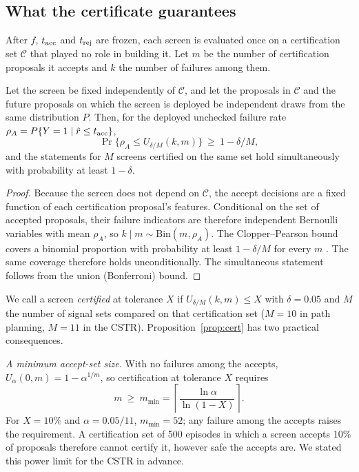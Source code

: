 \subsection{What the certificate guarantees}
After $f$, $t_{\mathrm{acc}}$ and $t_{\mathrm{rej}}$ are frozen, each screen is evaluated once on a certification set $\mathcal C$ that
played no role in building it. Let $m$ be the number of certification proposals it accepts and $k$ the number
of failures among them.

\begin{proposition}\label{prop:cert}
Let the screen be fixed independently of $\mathcal C$, and let the proposals in $\mathcal C$ and the future
proposals on which the screen is deployed be independent draws from the same distribution $P$. Then, for the
deployed unchecked failure rate $\rho_A=P\{Y=1\mid \hat r\le t_{\mathrm{acc}}\}$,
\[
\Pr\bigl\{\rho_A\le U_{\delta/M}(k,m)\bigr\}\ \ge\ 1-\delta/M,
\]
and the statements for $M$ screens certified on the same set hold simultaneously with probability at least
$1-\delta$.
\end{proposition}
\begin{proof}
Because the screen does not depend on $\mathcal C$, the accept decisions are a fixed function of each
certification proposal's features. Conditional on the set of accepted proposals, their failure indicators are
therefore independent Bernoulli variables with mean $\rho_A$, so $k\mid m\sim\mathrm{Bin}(m,\rho_A)$. The
Clopper--Pearson bound covers a binomial proportion with probability at least $1-\delta/M$ for every $m$
\citep{clopper1934}. The same coverage therefore holds unconditionally. The simultaneous statement follows from
the union (Bonferroni) bound.
\end{proof}

We call a screen \emph{certified} at tolerance $X$ if $U_{\delta/M}(k,m)\le X$ with $\delta=0.05$ and $M$ the number
of signal sets compared on that certification set ($M=10$ in path planning, $M=11$ in the CSTR).
Proposition~\ref{prop:cert} has two practical consequences.

\emph{A minimum accept-set size.} With no failures among the accepts, $U_\alpha(0,m)=1-\alpha^{1/m}$, so
certification at tolerance $X$ requires
\begin{equation}\label{eq:mmin}
m\ \ge\ m_{\min}=\left\lceil\frac{\ln\alpha}{\ln(1-X)}\right\rceil .
\end{equation}
For $X=10\%$ and $\alpha=0.05/11$, $m_{\min}=52$; any failure among the accepts raises the requirement. A
certification set of 500 episodes in which a screen accepts 10\% of proposals therefore cannot certify it, however
safe the accepts are. We stated this power limit for the CSTR in advance.

